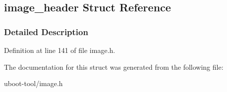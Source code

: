 \hypertarget{structimage__header}{}\subsection{image\+\_\+header Struct Reference}
\label{structimage__header}


\subsubsection{Detailed Description}


Definition at line 141 of file image.\+h.



The documentation for this struct was generated from the following file\+:\begin{DoxyCompactItemize}
\item 
uboot-\/tool/image.\+h\end{DoxyCompactItemize}
